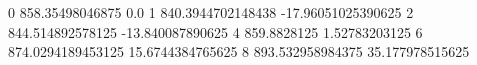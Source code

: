 0 858.35498046875 0.0
1 840.3944702148438 -17.96051025390625
2 844.514892578125 -13.840087890625
4 859.8828125 1.52783203125
6 874.0294189453125 15.6744384765625
8 893.532958984375 35.177978515625
